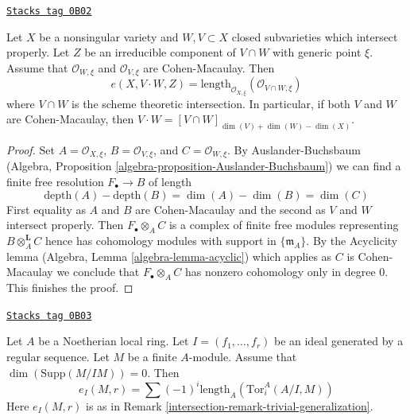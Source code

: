 \begin{lemma}
\label{intersection-lemma-intersection-multiplicity-CM}
\href{https://stacks.math.columbia.edu/tag/0B02}{\texttt{Stacks tag 0B02}}

Let $X$ be a nonsingular variety and $W, V \subset X$ closed
subvarieties which intersect properly. Let $Z$ be an irreducible component
of $V \cap W$ with generic point $\xi$. Assume that $\mathcal{O}_{W, \xi}$
and $\mathcal{O}_{V, \xi}$ are Cohen-Macaulay. Then
$$
e(X, V \cdot W, Z) =
\text{length}_{\mathcal{O}_{X, \xi}}(\mathcal{O}_{V \cap W, \xi})
$$
where $V \cap W$ is the scheme theoretic intersection.
In particular, if both $V$ and $W$ are Cohen-Macaulay, then
$V \cdot W = [V \cap W]_{\dim(V) + \dim(W) - \dim(X)}$.
\end{lemma}

\begin{proof}
Set $A = \mathcal{O}_{X, \xi}$, $B = \mathcal{O}_{V, \xi}$, and
$C = \mathcal{O}_{W, \xi}$. By Auslander-Buchsbaum
(Algebra, Proposition \ref{algebra-proposition-Auslander-Buchsbaum})
we can find a finite free resolution $F_\bullet \to B$ of
length
$$
\text{depth}(A) - \text{depth}(B) =
\dim(A) - \dim(B) = \dim(C)
$$
First equality as $A$ and $B$ are Cohen-Macaulay and the second
as $V$ and $W$ intersect properly. Then $F_\bullet \otimes_A C$ is a
complex of finite free modules representing $B \otimes_A^\mathbf{L} C$
hence has cohomology modules with support in $\{\mathfrak m_A\}$.
By the Acyclicity lemma (Algebra, Lemma \ref{algebra-lemma-acyclic})
which applies as $C$ is Cohen-Macaulay
we conclude that $F_\bullet \otimes_A C$ has nonzero
cohomology only in degree $0$. This finishes the proof.
\end{proof}

\begin{lemma}
\label{intersection-lemma-one-ideal-ci}
\href{https://stacks.math.columbia.edu/tag/0B03}{\texttt{Stacks tag 0B03}}

Let $A$ be a Noetherian local ring. Let $I = (f_1, \ldots, f_r)$ be an ideal
generated by a regular sequence. Let $M$ be a finite $A$-module. Assume that
$\dim(\text{Supp}(M/IM)) = 0$. Then
$$
e_I(M, r) = \sum (-1)^i\text{length}_A(\text{Tor}_i^A(A/I, M))
$$
Here $e_I(M, r)$ is as in Remark \ref{intersection-remark-trivial-generalization}.
\end{lemma}

